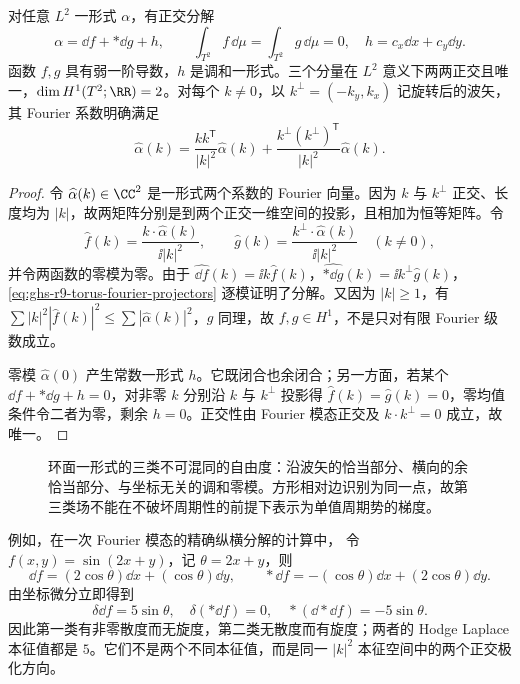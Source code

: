 \begin{theorem}
\label{thm:ghs-r9-torus-hodge}
对任意 $L^2$ 一形式 $\alpha$，有正交分解
\begin{equation}\label{eq:ghs-r9-torus-hodge-decomposition}
 \alpha=\dd f+*\dd g+h,
 \qquad \int_{T^2}f\,\dd\mu=\int_{T^2}g\,\dd\mu=0,
 \quad h=c_x\dd x+c_y\dd y.
\end{equation}
函数 $f,g$ 具有弱一阶导数，$h$ 是调和一形式。三个分量在 $L^2$ 意义下两两正交且唯一，$\dim H^1(T^2;\RR)=2$。对每个 $k\ne0$，以 $k^\perp=(-k_y,k_x)$ 记旋转后的波矢，其 Fourier 系数明确满足
\begin{equation}\label{eq:ghs-r9-torus-fourier-projectors}
 \widehat\alpha(k)=\frac{kk^\mathsf T}{|k|^2}\widehat\alpha(k)
 +\frac{k^\perp(k^\perp)^\mathsf T}{|k|^2}\widehat\alpha(k).
\end{equation}
\end{theorem}
\begin{proof}
令 $\widehat\alpha(k)\in\CC^2$ 是一形式两个系数的 Fourier 向量。因为 $k$ 与 $k^\perp$ 正交、长度均为 $|k|$，故两矩阵分别是到两个正交一维空间的投影，且相加为恒等矩阵。令
\[
 \widehat f(k)=\frac{k\cdot\widehat\alpha(k)}{\ii|k|^2},\qquad
 \widehat g(k)=\frac{k^\perp\cdot\widehat\alpha(k)}{\ii|k|^2}
 \quad(k\ne0),
\]
并令两函数的零模为零。由于 $\widehat{\dd f}(k)=\ii k\widehat f(k)$，$\widehat{*\dd g}(k)=\ii k^\perp\widehat g(k)$，\cref{eq:ghs-r9-torus-fourier-projectors} 逐模证明了分解。又因为 $|k|\ge1$，有 $\sum|k|^2|\widehat f(k)|^2\le\sum|\widehat\alpha(k)|^2$，$g$ 同理，故 $f,g\in H^1$，不是只对有限 Fourier 级数成立。

零模 $\widehat\alpha(0)$ 产生常数一形式 $h$。它既闭合也余闭合；另一方面，若某个 $\dd f+*\dd g+h=0$，对非零 $k$ 分别沿 $k$ 与 $k^\perp$ 投影得 $\widehat f(k)=\widehat g(k)=0$，零均值条件令二者为零，剩余 $h=0$。正交性由 Fourier 模态正交及 $k\cdot k^\perp=0$ 成立，故唯一。
\end{proof}

\begin{figure}[htbp]
\centering
\caption{环面一形式的三类不可混同的自由度：沿波矢的恰当部分、横向的余恰当部分、与坐标无关的调和零模。方形相对边识别为同一点，故第三类场不能在不破坏周期性的前提下表示为单值周期势的梯度。}\label{fig:ghs-r9-torus-hodge-classes}
\end{figure}

例如，在一次 Fourier 模态的精确纵横分解的计算中，
令 $f(x,y)=\sin(2x+y)$，记 $\theta=2x+y$，则
\begin{equation}\label{eq:ghs-r9-torus-hodge-sample}
 \dd f=(2\cos\theta)\dd x+(\cos\theta)\dd y,\qquad
 *\dd f=-(\cos\theta)\dd x+(2\cos\theta)\dd y.
\end{equation}
由坐标微分立即得到
\[
 \delta\dd f=5\sin\theta,\quad
 \delta(*\dd f)=0,\quad
 *(\dd*\dd f)=-5\sin\theta.
\]
因此第一类有非零散度而无旋度，第二类无散度而有旋度；两者的 Hodge Laplace 本征值都是 $5$。它们不是两个不同本征值，而是同一 $|k|^2$ 本征空间中的两个正交极化方向。

